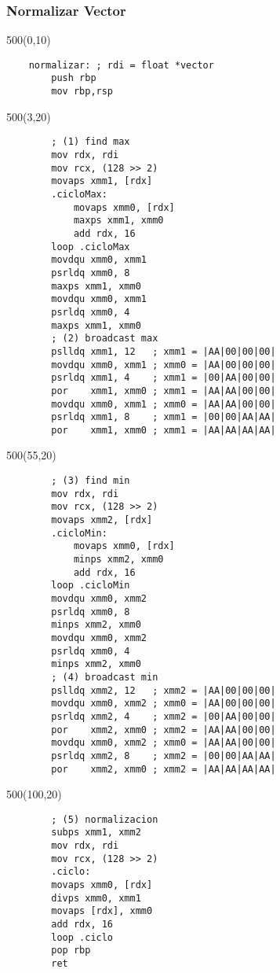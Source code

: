 \documentclass[aspectratio=169]{beamer}
\begin{document}
\begin{frame}[fragile,t]
    \frametitle{Normalizar Vector}
    \begin{textblock}{500}(0,10)
    \scriptsize
    \begin{verbatim}
    normalizar: ; rdi = float *vector
        push rbp
        mov rbp,rsp
    \end{verbatim}
    \end{textblock}
    \begin{textblock}{500}(3,20)
    \tiny
    \begin{verbatim}
        ; (1) find max
        mov rdx, rdi
        mov rcx, (128 >> 2)
        movaps xmm1, [rdx]
        .cicloMax:
            movaps xmm0, [rdx]
            maxps xmm1, xmm0
            add rdx, 16
        loop .cicloMax
        movdqu xmm0, xmm1
        psrldq xmm0, 8
        maxps xmm1, xmm0
        movdqu xmm0, xmm1
        psrldq xmm0, 4
        maxps xmm1, xmm0
        ; (2) broadcast max
        pslldq xmm1, 12   ; xmm1 = |AA|00|00|00|
        movdqu xmm0, xmm1 ; xmm0 = |AA|00|00|00|
        psrldq xmm1, 4    ; xmm1 = |00|AA|00|00|
        por    xmm1, xmm0 ; xmm1 = |AA|AA|00|00|
        movdqu xmm0, xmm1 ; xmm0 = |AA|AA|00|00|
        psrldq xmm1, 8    ; xmm1 = |00|00|AA|AA|
        por    xmm1, xmm0 ; xmm1 = |AA|AA|AA|AA|
    \end{verbatim}
    \end{textblock}
    \begin{textblock}{500}(55,20)
    \tiny
    \begin{verbatim}
        ; (3) find min
        mov rdx, rdi
        mov rcx, (128 >> 2)
        movaps xmm2, [rdx]
        .cicloMin:
            movaps xmm0, [rdx]
            minps xmm2, xmm0
            add rdx, 16
        loop .cicloMin
        movdqu xmm0, xmm2
        psrldq xmm0, 8
        minps xmm2, xmm0
        movdqu xmm0, xmm2
        psrldq xmm0, 4
        minps xmm2, xmm0
        ; (4) broadcast min
        pslldq xmm2, 12   ; xmm2 = |AA|00|00|00|
        movdqu xmm0, xmm2 ; xmm0 = |AA|00|00|00|
        psrldq xmm2, 4    ; xmm2 = |00|AA|00|00|
        por    xmm2, xmm0 ; xmm2 = |AA|AA|00|00|
        movdqu xmm0, xmm2 ; xmm0 = |AA|AA|00|00|
        psrldq xmm2, 8    ; xmm2 = |00|00|AA|AA|
        por    xmm2, xmm0 ; xmm2 = |AA|AA|AA|AA|
    \end{verbatim}
    \end{textblock}
    \begin{textblock}{500}(100,20)
    \scriptsize
    \begin{verbatim}
        ; (5) normalizacion
        subps xmm1, xmm2
        mov rdx, rdi
        mov rcx, (128 >> 2)
        .ciclo:
        movaps xmm0, [rdx]
        divps xmm0, xmm1
        movaps [rdx], xmm0
        add rdx, 16
        loop .ciclo
        pop rbp
        ret
    \end{verbatim}
    \end{textblock}
\end{frame}
\end{document}
